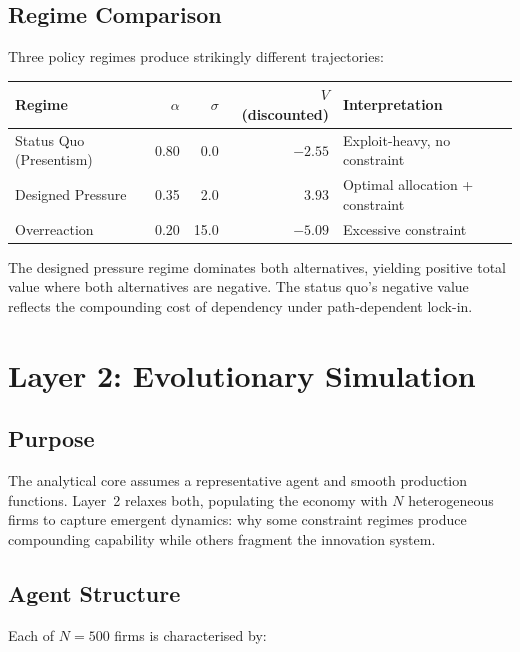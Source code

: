 \documentclass[11pt,a4paper]{article}
\theoremstyle{remark}
\begin{document}
\subsection{Regime Comparison}

Three policy regimes produce strikingly different trajectories:

\begin{center}
\begin{tabular}{lrrrl}
\toprule
\textbf{Regime} & $\alpha$ & $\sigma$ & \textbf{$V$ (discounted)} & \textbf{Interpretation} \\
\midrule
Status Quo (Presentism) & 0.80 & 0.0 & $-2.55$ & Exploit-heavy, no constraint \\
\textcolor{designed}{Designed Pressure} & 0.35 & 2.0 & $3.93$ & Optimal allocation + constraint \\
\textcolor{destructive}{Overreaction} & 0.20 & 15.0 & $-5.09$ & Excessive constraint \\
\bottomrule
\end{tabular}
\end{center}

The designed pressure regime dominates both alternatives, yielding positive total value where both alternatives are negative. The status quo's negative value reflects the compounding cost of dependency under path-dependent lock-in.

\section{Layer 2: Evolutionary Simulation}

\subsection{Purpose}

The analytical core assumes a representative agent and smooth production functions. Layer~2 relaxes both, populating the economy with $N$ heterogeneous firms to capture emergent dynamics: why some constraint regimes produce compounding capability while others fragment the innovation system.

\subsection{Agent Structure}

Each of $N = 500$ firms is characterised by:
\end{document}
